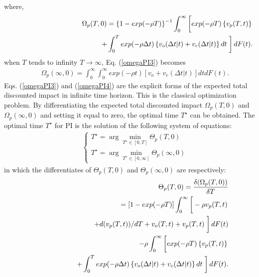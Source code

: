 where,
\begin{eqnarray}
&& \Omega_p(T,0) = \left\{1-exp(-\rho T)\right\}^{-1} \int_0^{\infty} \left[ \vphantom{\int_t} exp(-\rho T) \left\{ v_p(T,t) \right\} \right. \nonumber \\
&& \hspace{45mm}+ \int_0^T exp(-\rho \Delta t) \left\{ v_o (\Delta t|t) + v_c(\Delta t|t) \right\} dt \left.\vphantom{\int_t} \right] dF(t).\label{omegaPI3}
\end{eqnarray}
when $T$ tends to infinity $T \to \infty $, Eq. (\ref{omegaPI3}) becomes
\begin{eqnarray}
&& \Omega_p(\infty,0) = \int_0^{\infty}\int_0^{\infty}exp(-\rho t) \left[v_o + v_c(\Delta t|t) \right] dt dF(t).\label{omegaPI4}
\end{eqnarray}
Eqs. (\ref{omegaPI3}) and (\ref{omegaPI4}) are the explicit forms of the expected total discounted impact in infinite time horizon. This is the classical optimization problem. By differentiating the expected total discounted impact $\Omega_p(T,0)$ and $\Omega_p(\infty,0)$ and setting it equal to zero, the optimal time $T^{\star}$ can be obtained. 
The optimal time $T^{\star}$ for PI is the solution of the following system of equations:
\begin{eqnarray}
&& \left\{ {\begin{array}{*{20}{c}}
	{{T^{\star}} = \arg \mathop {\min }\limits_{{T^{\star}} \in [0,T]} {\Theta _p}(T,0)}\\
	{{T^{\star}} = \arg \mathop {\min }\limits_{{T^{\star}} \in [0,\infty ]} {\Theta _p}(\infty ,0)}
	\end{array}} \right. 
\end{eqnarray}
in which the differentiates of $\Theta_p(T,0)$ and $\Theta_p(\infty,0)$ are respectively:
\begin{eqnarray}
&& \Theta_p(T,0)  = \frac{\delta (\Omega_p(T,0))}{\delta T} \nonumber \\
&& \hspace{14mm} = \left[1-exp(-\rho T) \right] \int_0^{\infty} \left[ \vphantom{\int_t} -\rho v_p(T,t) \right. \nonumber \\
&& \hspace{20mm} +d(v_p(T,t))/dT + v_o(T,t) + v_p(T,t) \left.\vphantom{\int_t}\right]dF(t) \nonumber \\
&& \hspace{20mm} -\rho \int_0^{\infty} \left[ \vphantom{\int_t} exp(-\rho T)\left\{v_p(T,t) \right\}\right. \nonumber \\
&& \hspace{20mm}  +\int_0^T exp(-\rho \Delta t) \left\{v_o(\Delta t|t) + v_c(\Delta t|t) \right\} dt \left.\vphantom{\int_t}\right] dF(t).\label{omegaPI5}
\end{eqnarray}
